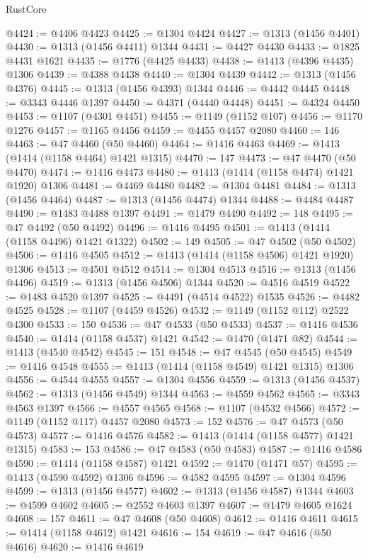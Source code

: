 \begin{lexlean}{RustCore}
\begin{coremodule}
@4424 := @4406 @4423
@4425 := @1304 @4424
@4427 := @1313 (@1456 @4401)
@4430 := @1313 (@1456 @4411) @1344
@4431 := @4427 @4430
@4433 := @1825 @4431 @1621
@4435 := @1776 (@4425 @4433)
@4438 := @1413 (@4396 @4435) @1306
@4439 := @4388 @4438
@4440 := @1304 @4439
@4442 := @1313 (@1456 @4376)
@4445 := @1313 (@1456 @4393) @1344
@4446 := @4442 @4445
@4448 := @3343 @4446 @1397
@4450 := @4371 (@4440 @4448)
@4451 := @4324 @4450
@4453 := @1107 (@4301 @4451)
@4455 := @1149 (@1152 @107)
@4456 := @1170 @1276
@4457 := @1165 @4456
@4459 := @4455 @4457 @2080
@4460 := 146
@4463 := @47 @4460 (@50 @4460)
@4464 := @1416 @4463
@4469 := @1413 (@1414 (@1158 @4464) @1421 @1315)
@4470 := 147
@4473 := @47 @4470 (@50 @4470)
@4474 := @1416 @4473
@4480 := @1413 (@1414 (@1158 @4474) @1421 @1920) @1306
@4481 := @4469 @4480
@4482 := @1304 @4481
@4484 := @1313 (@1456 @4464)
@4487 := @1313 (@1456 @4474) @1344
@4488 := @4484 @4487
@4490 := @1483 @4488 @1397
@4491 := @1479 @4490
@4492 := 148
@4495 := @47 @4492 (@50 @4492)
@4496 := @1416 @4495
@4501 := @1413 (@1414 (@1158 @4496) @1421 @1322)
@4502 := 149
@4505 := @47 @4502 (@50 @4502)
@4506 := @1416 @4505
@4512 := @1413 (@1414 (@1158 @4506) @1421 @1920) @1306
@4513 := @4501 @4512
@4514 := @1304 @4513
@4516 := @1313 (@1456 @4496)
@4519 := @1313 (@1456 @4506) @1344
@4520 := @4516 @4519
@4522 := @1483 @4520 @1397
@4525 := @4491 (@4514 @4522) @1535
@4526 := @4482 @4525
@4528 := @1107 (@4459 @4526)
@4532 := @1149 (@1152 @112) @2522 @4300
@4533 := 150
@4536 := @47 @4533 (@50 @4533)
@4537 := @1416 @4536
@4540 := @1414 (@1158 @4537) @1421
@4542 := @1470 (@1471 @82)
@4544 := @1413 (@4540 @4542)
@4545 := 151
@4548 := @47 @4545 (@50 @4545)
@4549 := @1416 @4548
@4555 := @1413 (@1414 (@1158 @4549) @1421 @1315) @1306
@4556 := @4544 @4555
@4557 := @1304 @4556
@4559 := @1313 (@1456 @4537)
@4562 := @1313 (@1456 @4549) @1344
@4563 := @4559 @4562
@4565 := @3343 @4563 @1397
@4566 := @4557 @4565
@4568 := @1107 (@4532 @4566)
@4572 := @1149 (@1152 @117) @4457 @2080
@4573 := 152
@4576 := @47 @4573 (@50 @4573)
@4577 := @1416 @4576
@4582 := @1413 (@1414 (@1158 @4577) @1421 @1315)
@4583 := 153
@4586 := @47 @4583 (@50 @4583)
@4587 := @1416 @4586
@4590 := @1414 (@1158 @4587) @1421
@4592 := @1470 (@1471 @57)
@4595 := @1413 (@4590 @4592) @1306
@4596 := @4582 @4595
@4597 := @1304 @4596
@4599 := @1313 (@1456 @4577)
@4602 := @1313 (@1456 @4587) @1344
@4603 := @4599 @4602
@4605 := @2552 @4603 @1397
@4607 := @1479 @4605 @1624
@4608 := 157
@4611 := @47 @4608 (@50 @4608)
@4612 := @1416 @4611
@4615 := @1414 (@1158 @4612) @1421
@4616 := 154
@4619 := @47 @4616 (@50 @4616)
@4620 := @1416 @4619

\end{coremodule}
\end{lexlean}
